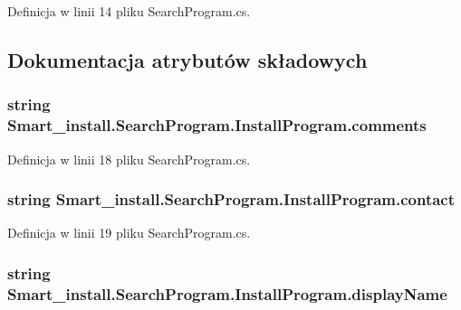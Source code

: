 Definicja w linii 14 pliku Search\+Program.\+cs.



\subsection{Dokumentacja atrybutów składowych}
\hypertarget{struct_smart__install_1_1_search_program_1_1_install_program_a4328e53b176bc95dbeeda397045f893b}{
\subsubsection[{comments}]{\setlength{\rightskip}{0pt plus 5cm}string Smart\+\_\+install.\+Search\+Program.\+Install\+Program.\+comments}}\label{struct_smart__install_1_1_search_program_1_1_install_program_a4328e53b176bc95dbeeda397045f893b}


Definicja w linii 18 pliku Search\+Program.\+cs.

\hypertarget{struct_smart__install_1_1_search_program_1_1_install_program_a9ac05784dcc59e1f79fe162c873d48d7}{
\subsubsection[{contact}]{\setlength{\rightskip}{0pt plus 5cm}string Smart\+\_\+install.\+Search\+Program.\+Install\+Program.\+contact}}\label{struct_smart__install_1_1_search_program_1_1_install_program_a9ac05784dcc59e1f79fe162c873d48d7}


Definicja w linii 19 pliku Search\+Program.\+cs.

\hypertarget{struct_smart__install_1_1_search_program_1_1_install_program_a07c41cefb50c426c1df814338c30a478}{
\subsubsection[{display\+Name}]{\setlength{\rightskip}{0pt plus 5cm}string Smart\+\_\+install.\+Search\+Program.\+Install\+Program.\+display\+Name}}\label{struct_smart__install_1_1_search_program_1_1_install_program_a07c41cefb50c426c1df814338c30a478}


